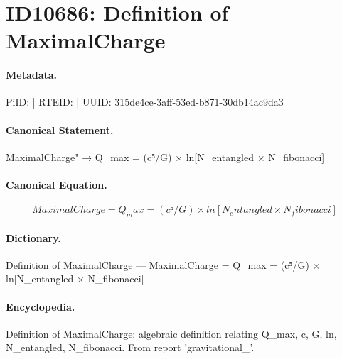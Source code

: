\section*{ID10686: Definition of MaximalCharge}
\paragraph{Metadata.}
PiID:  | RTEID:  | UUID: 315de4ce-3aff-53ed-b871-30db14ac9da3

\paragraph{Canonical Statement.}
MaximalCharge" → Q\_max = (c⁵/G) × ln[N\_entangled × N\_fibonacci]

\paragraph{Canonical Equation.}
\[
MaximalCharge = Q_max = (c⁵/G) × ln[N_entangled × N_fibonacci]
\]

\paragraph{Dictionary.}
Definition of MaximalCharge — MaximalCharge = Q\_max = (c⁵/G) × ln[N\_entangled × N\_fibonacci]

\paragraph{Encyclopedia.}
Definition of MaximalCharge: algebraic definition relating Q\_max, c, G, ln, N\_entangled, N\_fibonacci. From report 'gravitational\_'.
